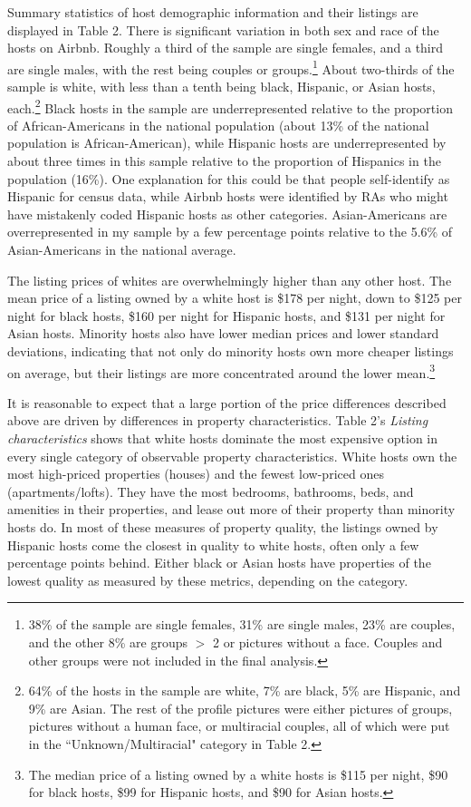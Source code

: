 Summary statistics of host demographic information and their listings are displayed in Table 2. There is significant variation in both sex and race of the hosts on Airbnb. Roughly a third of the sample are single females, and a third are single males, with the rest being couples or groups.\footnote{38\% of the sample are single females, 31\% are single males, 23\% are couples, and the other 8\% are groups $>$ 2 or pictures without a face. Couples and other groups were not included in the final analysis.} About two-thirds of the sample is white, with less than a tenth being black, Hispanic, or Asian hosts, each.\footnote{64\% of the hosts in the sample are white, 7\% are black, 5\% are Hispanic, and 9\% are Asian. The rest of the profile pictures were either pictures of groups, pictures without a human face, or multiracial couples, all of which were put in the ``Unknown/Multiracial" category in Table 2.} Black hosts in the sample are underrepresented relative to the proportion of African-Americans in the national population (about 13\% of the national population is African-American), while Hispanic hosts are underrepresented by about three times in this sample relative to the proportion of Hispanics in the population (16\%). One explanation for this could be that people self-identify as Hispanic for census data, while Airbnb hosts were identified by RAs who might have mistakenly coded Hispanic hosts as other categories. Asian-Americans are overrepresented in my sample by a few percentage points relative to the 5.6\% of Asian-Americans in the national average.\cite{census} 

The listing prices of whites are overwhelmingly higher than any other host. The mean price of a listing owned by a white host is \$178 per night, down to \$125 per night for black hosts, \$160 per night for Hispanic hosts, and \$131 per night for Asian hosts. Minority hosts also have lower median prices and lower standard deviations, indicating that not only do minority hosts own more cheaper listings on average, but their listings are more concentrated around the lower mean.\footnote{The median price of a listing owned by a white hosts is \$115 per night, \$90 for black hosts, \$99 for Hispanic hosts, and \$90 for Asian hosts.} 

It is reasonable to expect that a large portion of the price differences described above are driven by differences in property characteristics. Table 2's \textit{Listing characteristics} shows that white hosts dominate the most expensive option in every single category of observable property characteristics. White hosts own the most high-priced properties (houses) and the fewest low-priced ones (apartments/lofts). They have the most bedrooms, bathrooms, beds, and amenities in their properties, and lease out more of their property than minority hosts do. In most of these measures of property quality, the listings owned by Hispanic hosts come the closest in quality to white hosts, often only a few percentage points behind. Either black or Asian hosts have properties of the lowest quality as measured by these metrics, depending on the category. 

